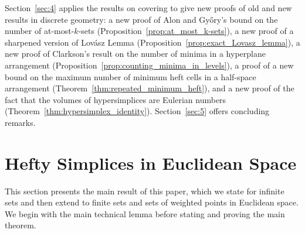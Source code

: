 \documentclass[a4paper,UKenglish,cleveref, autoref,numberwithinsect]{socg-lipics-v2021}
\theoremstyle{plain}
\begin{document}
%
Section~\ref{sec:4} applies the results on covering to give new proofs of old and new results in discrete geometry: a new proof of Alon and Gy\H{o}ry's bound on the number of at-most-$k$-sets (Proposition~\ref{prop:at_most_k-sets}), a new proof of a sharpened version of Lov\'{a}sz Lemma (Proposition~\ref{prop:exact_Lovasz_lemma}), a new proof of Clarkson's result on the number of minima in a hyperplane arrangement (Proposition~\ref{prop:counting_minima_in_levels}), a proof of a new bound on the maximum number of minimum heft cells in a half-space arrangement (Theorem~\ref{thm:repeated_minimum_heft}), and a new proof of the fact that the volumes of hypersimplices are Eulerian numbers (Theorem~\ref{thm:hypersimplex_identity}).
Section~\ref{sec:5} offers concluding remarks.
\section{Hefty Simplices in Euclidean Space}
\label{sec:2}
This section presents the main result of this paper, which we state for infinite sets and then extend to finite sets and sets of weighted points in Euclidean space.
We begin with the main technical lemma before stating and proving the main theorem.
\end{document}

